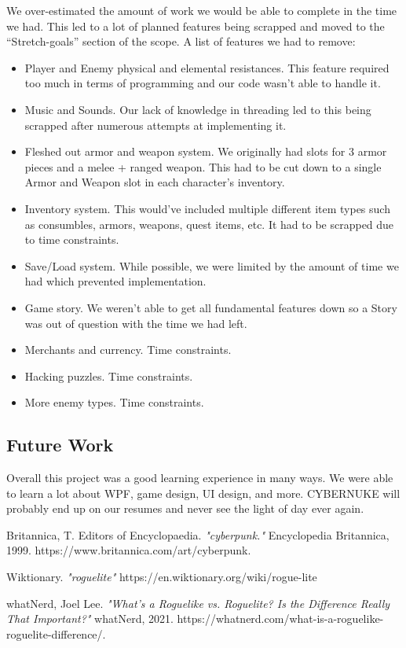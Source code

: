 \documentclass[10pt,conference,onecolumn,compsoc]{IEEEtran}
\begin{document}
We over-estimated the amount of work we would be able to complete in the time we had. This led to a lot of planned features being scrapped and moved to the “Stretch-goals” section of the scope.
A list of features we had to remove:
\begin{itemize}
\item Player and Enemy physical and elemental resistances. This feature required too much in terms of programming and our code wasn't able to handle it.
\item Music and Sounds. Our lack of knowledge in threading led to this being scrapped after numerous attempts at implementing it.
\item Fleshed out armor and weapon system. We originally had slots for 3 armor pieces and a melee + ranged weapon. This had to be cut down to a single Armor and Weapon slot in each character's inventory.
\item Inventory system. This would've included multiple different item types such as consumbles, armors, weapons, quest items, etc. It had to be scrapped due to time constraints.
\item Save/Load system. While possible, we were limited by the amount of time we had which prevented implementation.
\item Game story. We weren't able to get all fundamental features down so a Story was out of question with the time we had left.
\item Merchants and currency. Time constraints.
\item Hacking puzzles. Time constraints.
\item More enemy types. Time constraints.
\end{itemize}

\subsection{Future Work}
Overall this project was a good learning experience in many ways. We were able to learn a lot about WPF, game design, UI design, and more. CYBERNUKE will probably end up on our resumes and never see the light of day ever again.





\begin{thebibliography}{1}

Britannica, T. Editors of Encyclopaedia. \emph{"cyberpunk."} Encyclopedia Britannica, 1999. https://www.britannica.com/art/cyberpunk.

Wiktionary. \emph{"roguelite"}
https://en.wiktionary.org/wiki/rogue-lite

whatNerd, Joel Lee. \emph{"What’s a Roguelike vs. Roguelite? Is the Difference Really That Important?"} whatNerd, 2021. https://whatnerd.com/what-is-a-roguelike-roguelite-difference/.

\end{thebibliography}

\end{document}
